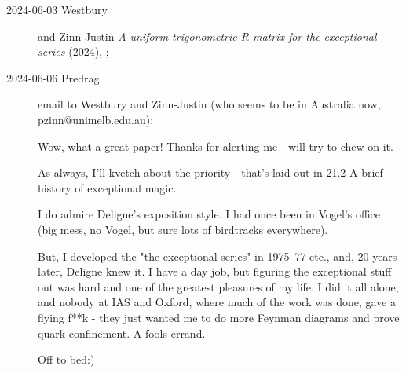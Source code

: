 \begin{description}
\item[2024-06-03 Westbury] and Zinn-Justin
{\em A uniform trigonometric R-matrix for the exceptional series} (2024),
;

\item[2024-06-06 Predrag] email to  Westbury and Zinn-Justin (who
seems to be in Australia now, pzinn@unimelb.edu.au):

Wow, what a great paper! Thanks for alerting me - will try to chew on it.

As always, I'll kvetch about the priority - that's laid out in
{21.2 A brief history of exceptional magic}.

I do admire Deligne's exposition style. I had once been in Vogel's office
(big mess, no Vogel, but sure lots of birdtracks everywhere).

But, I developed the "the exceptional series" in 1975–77 etc., and, 20
years later,  Deligne
 {knew it}.
I have a day job, but figuring the exceptional stuff out was hard and
one of the greatest pleasures of my life. I did it all alone, and nobody
at IAS and Oxford, where much of the work was done, gave a flying f**k -
they just wanted me to do more Feynman diagrams and prove quark
confinement. A fools errand.

Off to bed:)







\end{description}
\renewcommand{\ssp}{a}


\printbibliography[heading=subbibintoc,title={References}]
